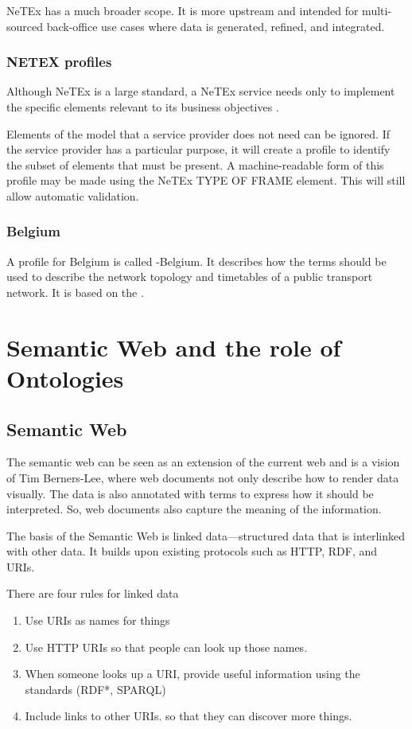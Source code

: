 NeTEx has a much broader scope. It is more upstream and intended for multi-sourced back-office use cases where data is generated, refined, and integrated.
\subsubsection{NETEX profiles}
Although NeTEx is a large standard, a NeTEx service needs only to implement the specific elements relevant to its business objectives \cite{noauthor_what_nodate}. 

Elements of the model that a service provider does not need can be ignored. If the service provider has a particular purpose, it will create a profile to identify the subset of elements that must be present. A machine-readable form of this profile may be made using the NeTEx TYPE OF FRAME element. This will still allow automatic validation.
\subsubsection{ Belgium}
A  profile for Belgium is called -Belgium. It describes how the terms should be used to describe the network topology and timetables of a public transport network. It is based on the . 

\section{Semantic Web and the role of Ontologies}\label{section:ontologies_rel_work}
\subsection{Semantic Web}
The semantic web can be seen as an extension of the current web and is a vision of Tim Berners-Lee, where web documents not only describe how to render data visually. The data is also annotated with terms to express how it should be interpreted. So, web documents also capture the meaning of the information.

The basis of the Semantic Web is linked data—structured data that is interlinked with other data. It builds upon existing protocols such as HTTP, RDF, and URIs.

There are four rules for linked data
\begin{enumerate}
    \item Use URIs as names for things

    \item Use HTTP URIs so that people can look up those names.

    \item When someone looks up a URI, provide useful information using the standards (RDF*, SPARQL)

    \item Include links to other URIs. so that they can discover more things.

\end{enumerate}

